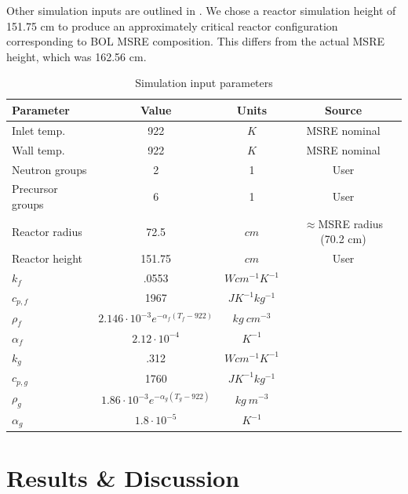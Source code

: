 \documentclass{article}
\let\Oldsection\section
\renewcommand{\section}{\FloatBarrier\Oldsection}
\begin{document}
Other simulation inputs are outlined in .
We chose a reactor simulation height of 151.75 cm to produce an
approximately critical reactor configuration corresponding to \gls{BOL}
\gls{MSRE} composition. This differs from the actual \gls{MSRE} height, which 
was 162.56 cm.

\begin{table}[htpb]
  \begin{center}
    \begin{tabular}{l|c|c|c}
      Parameter & Value & Units & Source\\\hline\hline
      Inlet temp. & 922 & $K$ & \gls{MSRE} nominal \cite{robertson_msre_1965}\\
      Wall temp. & 922 & $K$ & \gls{MSRE} nominal \cite{robertson_msre_1965}\\
      Neutron groups & 2 & 1 & User\\
      Precursor groups & 6 & 1 & User\\
      Reactor radius & 72.5 & $cm$ & $\approx$\gls{MSRE} radius (70.2 cm) \cite{robertson_msre_1965}\\
      Reactor height & 151.75 & $cm$ & User\\
      $k{_f}$ & .0553 & $W cm^{-1} K^{-1}$ & \cite{robertson_msre_1965}\\
      $c_{p,f}$ & 1967 & $J K^{-1} kg^{-1}$ & \cite{robertson_msre_1965}\\
      $\rho_f$ & $2.146\cdot 10^{-3} e^{-\alpha_f (T_f - 922)}$ & $kg\ cm^{-3}$ & \cite{robertson_msre_1965}\\
      $\alpha_f$ & $2.12\cdot 10^{-4}$ & $K^{-1}$ &
      \cite{haubenreich_experience_1970}\\
      $k_g$ & .312 & $W cm^{-1} K^{-1}$ & \cite{cammi_multi-physics_2011}\\
      $c_{p,g}$ & 1760 & $J K^{-1} kg^{-1}$ & \cite{cammi_multi-physics_2011}\\
      $\rho_g$ & $1.86\cdot 10^{-3} e^{-\alpha_g (T_g - 922)}$ & $kg\ m^{-3}$ &
      \cite{robertson_msre_1965}\\
      $\alpha_g$ & $1.8\cdot 10^{-5}$ & $K^{-1}$ &
      \cite{haubenreich_experience_1970}\\
    \end{tabular}
  \end{center}
  \caption{Simulation input parameters}
  \label{table:params}
\end{table}


\section{Results \& Discussion}
\end{document}

